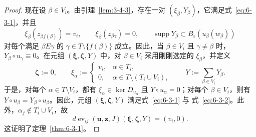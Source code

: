 \begin{proof}
现在设 $\beta\in V_i$。由引理~\ref{lem:3-4-3}，存在一对
$(\xi_\beta,Y_\beta)$，它满足式~\eqref{eq:6-3-1}，并且
\[
  \xi_\beta(z_{\beta f(\beta)})=v_i,
  \qquad
  \xi_\beta(z_{\beta\gamma})=0,
  \qquad
  \operatorname{supp}Y_\beta
  \subset B_\varepsilon(u_\beta(w_\beta))
\]
对每个满足 $\beta E\gamma$ 的
$\gamma\in T\setminus\{f(\beta)\}$ 成立。因此，当 $\beta\in V_i$ 且
$\gamma\ne\beta$ 时，$Y_\beta\circ u_\gamma\equiv0$。在元组
$(\boldsymbol\xi,\boldsymbol\zeta,Y)$ 中，对 $\beta\in V_i$ 采用刚刚选定的
$\xi_\beta$，并定义
\[
  \boldsymbol\zeta:=0,
  \qquad
  \xi_\alpha:=
  \begin{cases}
    v_i,&\alpha\in T_i,\\
    0,&\alpha\in T\setminus(T_i\cup V_i),
  \end{cases}
  \qquad
  Y:=\sum_{\beta\in V_i}Y_\beta.
\]
于是，对每个 $\alpha\in T\setminus V_i$，都有
$\xi_\alpha\in\ker D_{u_\alpha}$ 且 $Y\circ u_\alpha=0$；对每个
$\beta\in V_i$，则有 $Y\circ u_\beta=Y_\beta\circ u_\beta$。因此，元组
$(\boldsymbol\xi,\boldsymbol\zeta,Y)$ 满足式~\eqref{eq:6-3-1} 与
式~\eqref{eq:6-3-2}。此外，$\alpha_j\notin T_i\cup V_i$，故
\[
  d\operatorname{ev}_{ij}(\mathbf u,\mathbf z,J)
  (\boldsymbol\xi,\boldsymbol\zeta,Y)=(v_i,0).
\]
这证明了定理~\ref{thm:6-3-1}。
\end{proof}


